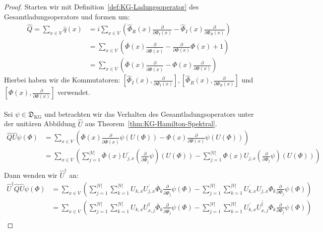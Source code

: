 \documentclass[11pt,a4paper,leqno]{report}
\numberwithin{equation}{chapter}
\begin{document}
\begin{proof}
Starten wir mit Definition~\ref{def:KG-Ladungsoperator} des Gesamtladungsoperators und formen um:
	\begin{align*}
		\hat{Q} = \sum_{x\in V} \hat{q}(x)&=i\sum_{x\in V} \left(\hat{\Phi}_R(x)\frac{\partial}{\partial \Phi_I(x)} - \hat{\Phi}_I(x)\frac{\partial}{\partial \Phi_R(x)} \right)\\
		&=\sum_{x\in V} \left(\overline{\Phi}(x)\frac{\partial}{\partial\overline{\Phi(x)}} - \frac{\partial}{\partial\Phi(x)}\Phi(x) +1\right)\\
		&=\sum_{x\in V} \left(\overline{\Phi}(x)\frac{\partial}{\partial\overline{\Phi(x)}} - \Phi(x)\frac{\partial}{\partial\Phi(x)} \right)
\end{align*}
Hierbei haben wir die Kommutatoren: \([\hat{\Phi}_I(x),\frac{\partial}{\partial \Phi_I(x)}], [\hat{\Phi}_R(x),\frac{\partial}{\partial \Phi_R(x)}]\) und\([\hat{\Phi}(x),\frac{\partial}{\partial \Phi(x)}]\) verwendet.\\
\\
Sei $\psi\in \mathfrak{D}_{\mathrm{KG}}$ und betrachten wir das Verhalten des Gesamtladungsoperators unter der unitären Abbildung \(\hat{U}\) aus Theorem~\ref{thm:KG-Hamilton-Spektral}.
\begin{align*}
	\hat{Q}\hat{U}\psi(\Phi) &= \sum_{x\in V}\left(\overline{\Phi}(x)\frac{\partial}{\partial\overline{\Phi(x)}}\psi(U(\Phi)) - \Phi(x)\frac{\partial}{\partial\Phi(x)}\psi(U(\Phi))\right)\\
	&= \sum_{x\in V} \left(\sum_{j=1}^{|V|}\overline{\Phi}(x)\overline{U_{j,x}}(\frac{\partial}{\partial\overline{\Phi_{j}}}\psi)(U(\Phi)) - \sum_{j=1}^{|V|}\Phi(x) U_{j,x}(\frac{\partial}{\partial\Phi_{j}}\psi)(U(\Phi))\right)\\
\end{align*}	
Dann wenden wir \(\hat{U}^\dagger\) an:
\begin{align*}
	\hat{U}^\dagger\hat{Q}\hat{U}\psi(\Phi) &= \sum_{x\in V} \left(\sum_{j=1}^{|V|}\sum_{k=1}^{|V|}U_{k,x}\overline{U_{j,x}}\overline{\Phi}_k\frac{\partial}{\partial\overline{\Phi_{j}}}\psi(\Phi)-\sum_{j=1}^{|V|}\sum_{k=1}^{|V|}\overline{U_{k,x}} U_{j,x}\Phi_k\frac{\partial}{\partial\Phi_{j}}\psi(\Phi)\right)\\
	&= \sum_{x\in V} \left(\sum_{j=1}^{|V|}\sum_{k=1}^{|V|}U_{k,x}U^\dagger_{x,j}\overline{\Phi}_k\frac{\partial}{\partial\overline{\Phi_{j}}}\psi(\Phi) - \sum_{j=1}^{|V|}\sum_{k=1}^{|V|}\overline{U_{k,x}} \overline{U^\dagger_{x,j}}\Phi_k\frac{\partial}{\partial\Phi_{j}}\psi(\Phi)\right)\\

\end{align*}
\end{proof}
\end{document}
